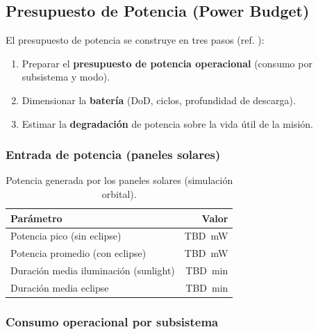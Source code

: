 
\subsection{Presupuesto de Potencia (Power Budget)}

El presupuesto de potencia se construye en tres pasos (ref. \cite{Wertz2011}):
\begin{enumerate}
    \item Preparar el \textbf{presupuesto de potencia operacional} (consumo por subsistema y modo).
    \item Dimensionar la \textbf{batería} (DoD, ciclos, profundidad de descarga).
    \item Estimar la \textbf{degradación} de potencia sobre la vida útil de la misión.
\end{enumerate}

\subsubsection*{Entrada de potencia (paneles solares)}

\begin{table}[h]
\centering
\caption{Potencia generada por los paneles solares (simulación orbital).}
\label{tab:power_input}
\begin{tabular}{lr}
\toprule
\textbf{Parámetro} & \textbf{Valor} \\
\midrule
Potencia pico (sin eclipse)         & TBD~mW \\
Potencia promedio (con eclipse)     & TBD~mW \\
Duración media iluminación (sunlight) & TBD~min \\
Duración media eclipse              & TBD~min \\
\bottomrule
\end{tabular}
\end{table}

\subsubsection*{Consumo operacional por subsistema}

